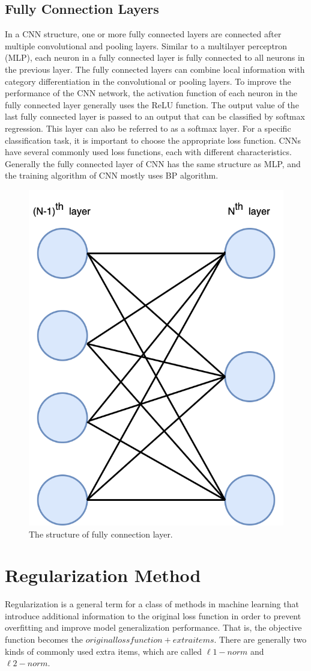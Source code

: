 \subsection{Fully Connection Layers}

In a CNN structure, one or more fully connected layers are connected after multiple convolutional and pooling layers. Similar to a multilayer perceptron (MLP), each neuron in a fully connected layer is fully connected to all neurons in the previous layer. The fully connected layers can combine local information with category differentiation in the convolutional or pooling layers. To improve the performance of the CNN network, the activation function of each neuron in the fully connected layer generally uses the ReLU function. The output value of the last fully connected layer is passed to an output that can be classified by softmax regression. This layer can also be referred to as a softmax layer. For a specific classification task, it is important to choose the appropriate loss function. CNNs have several commonly used loss functions, each with different characteristics. Generally the fully connected layer of CNN has the same structure as MLP, and the training algorithm of CNN mostly uses BP algorithm.
\begin{figure}[H]
	\centering
	\includegraphics[width=0.4\linewidth]{figures/fc}
	\caption[The structure of fully connection layer]{The structure of fully connection layer.}
	\label{fig:fclayer}
\end{figure}


\section{Regularization Method}
\label{section:transformer}
Regularization is a general term for a class of methods in machine learning that introduce additional information to the original loss function in order to prevent overfitting and improve model generalization performance. That is, the objective function becomes the $original loss function + extra items$. There are generally two kinds of commonly used extra items, which are called $\ell 1-n o r m$ and $\ell 2-n o r m$.


